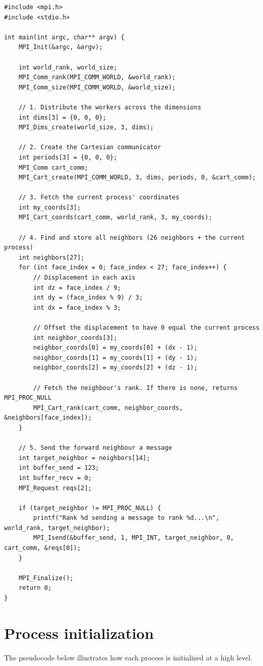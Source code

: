 \documentclass[cic,tc,english]{infufrgs}
\begin{document}
\begin{lstlisting}[style=CStyle, caption={Domain initialization in MPI}]
#include <mpi.h>
#include <stdio.h>

int main(int argc, char** argv) {
    MPI_Init(&argc, &argv);

    int world_rank, world_size;
    MPI_Comm_rank(MPI_COMM_WORLD, &world_rank);
    MPI_Comm_size(MPI_COMM_WORLD, &world_size);

    // 1. Distribute the workers across the dimensions
    int dims[3] = {0, 0, 0};
    MPI_Dims_create(world_size, 3, dims);

    // 2. Create the Cartesian communicator
    int periods[3] = {0, 0, 0};
    MPI_Comm cart_comm;
    MPI_Cart_create(MPI_COMM_WORLD, 3, dims, periods, 0, &cart_comm);

    // 3. Fetch the current process' coordinates
    int my_coords[3];
    MPI_Cart_coords(cart_comm, world_rank, 3, my_coords);

    // 4. Find and store all neighbors (26 neighbors + the current process)
    int neighbors[27];
    for (int face_index = 0; face_index < 27; face_index++) {
        // Displacement in each axis
        int dz = face_index / 9;
        int dy = (face_index % 9) / 3;
        int dx = face_index % 3;

        // Offset the displacement to have 0 equal the current process
        int neighbor_coords[3];
        neighbor_coords[0] = my_coords[0] + (dx - 1);
        neighbor_coords[1] = my_coords[1] + (dy - 1);
        neighbor_coords[2] = my_coords[2] + (dz - 1);

        // Fetch the neighbour's rank. If there is none, returns MPI_PROC_NULL
        MPI_Cart_rank(cart_comm, neighbor_coords, &neighbors[face_index]);
    }

    // 5. Send the forward neighbour a message
    int target_neighbor = neighbors[14];
    int buffer_send = 123;
    int buffer_recv = 0;
    MPI_Request reqs[2];

    if (target_neighbor != MPI_PROC_NULL) {
        printf("Rank %d sending a message to rank %d...\n", world_rank, target_neighbor);
        MPI_Isend(&buffer_send, 1, MPI_INT, target_neighbor, 0, cart_comm, &reqs[0]);
    }

    MPI_Finalize();
    return 0;
}
\end{lstlisting}

\chapter{Process initialization}
The pseudocode below illustrates how each process is initialized at a
high level.
\end{document}
